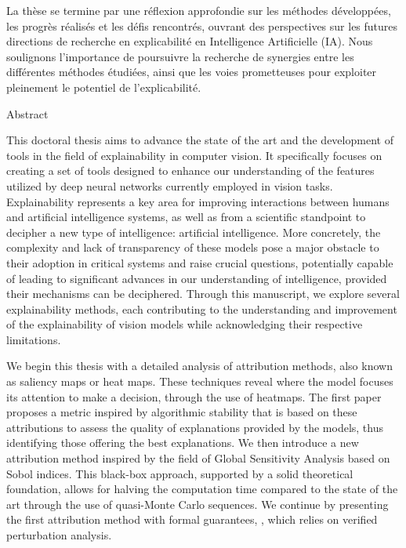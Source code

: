 La thèse se termine par une réflexion approfondie sur les méthodes développées, les progrès réalisés et les défis rencontrés, ouvrant des perspectives sur les futures directions de recherche en explicabilité en Intelligence Artificielle (IA). Nous soulignons l'importance de poursuivre la recherche de synergies entre les différentes méthodes étudiées, ainsi que les voies prometteuses pour exploiter pleinement le potentiel de l'explicabilité.

\clearpage

\begin{center}
{\Large Abstract \\ }
\end{center}

This doctoral thesis aims to advance the state of the art and the development of tools in the field of explainability in computer vision. It specifically focuses on creating a set of tools designed to enhance our understanding of the features utilized by deep neural networks currently employed in vision tasks. Explainability represents a key area for improving interactions between humans and artificial intelligence systems, as well as from a scientific standpoint to decipher a new type of intelligence: artificial intelligence. More concretely, the complexity and lack of transparency of these models pose a major obstacle to their adoption in critical systems and raise crucial questions, potentially capable of leading to significant advances in our understanding of intelligence, provided their mechanisms can be deciphered. Through this manuscript, we explore several explainability methods, each contributing to the understanding and improvement of the explainability of vision models while acknowledging their respective limitations.

We begin this thesis with a detailed analysis of attribution methods, also known as saliency maps or heat maps. These techniques reveal where the model focuses its attention to make a decision, through the use of heatmaps. The first paper proposes a metric inspired by algorithmic stability that is based on these attributions to assess the quality of explanations provided by the models, thus identifying those offering the best explanations. We then introduce a new attribution method inspired by the field of Global Sensitivity Analysis based on Sobol indices. This black-box approach, supported by a solid theoretical foundation, allows for halving the computation time compared to the state of the art through the use of quasi-Monte Carlo sequences. We continue by presenting the first attribution method with formal guarantees, \eva, which relies on verified perturbation analysis.

